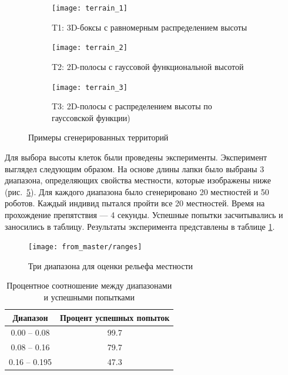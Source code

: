 \begin{figure}[H]
    \begin{subfigure}{0.99\textwidth}
    \centering\texttt{[image: terrain\_1]} 
    \caption{T1: 3D-боксы с равномерным распределением высоты}
    \label{fig:terrain_1}
    \end{subfigure}

    \begin{subfigure}{0.99\textwidth}
    \centering\texttt{[image: terrain\_2]} 
    \caption{T2: 2D-полосы с гауссовой функциональной высотой}
    \label{fig:terrain_2}
    \end{subfigure}


    \begin{subfigure}{0.99\textwidth}
    \centering\texttt{[image: terrain\_3]}
    \caption{T3: 2D-полосы с распределением высоты по гауссовской функции)}
    \label{fig:terrain_3}
    \end{subfigure}
     
    \caption{Примеры сгенерированных территорий}
    \label{fig:terrains}
\end{figure}

Для выбора высоты клеток были проведены эксперименты. Эксперимент выглядел следующим образом. На основе длины лапки было выбраны 3 диапазона, определяющих свойства местности, которые изображены ниже (рис.~\ref{fig:range}). Для каждого диапазона было сгенерировано 20 местностей и 50 роботов. Каждый индивид пытался пройти все 20 местностей. Время на прохождение препятствия --- 4 секунды. Успешные попытки засчитывались и заносились в таблицу. Результаты эксперимента представлены в таблице \ref{tabular:ranges}.

\begin{figure}[H]
\centering\texttt{[image: from\_master/ranges]}\\
\caption{Три диапазона для оценки рельефа местности}
\label{fig:range}
\end{figure}


\begin{table}[H]
\caption{Процентное соотношение между диапазонами и успешными попытками}
\label{tabular:ranges}
\centering
\begin{tabular}{c|c}
 \textbf{Диапазон} & \textbf{Процент успешных попыток}\\
 \hline
0.00 -- 0.08 & 99.7 \\ 
0.08 -- 0.16 & 79.7 \\
0.16 -- 0.195 & 47.3 \\
\end{tabular}
\end{table}


